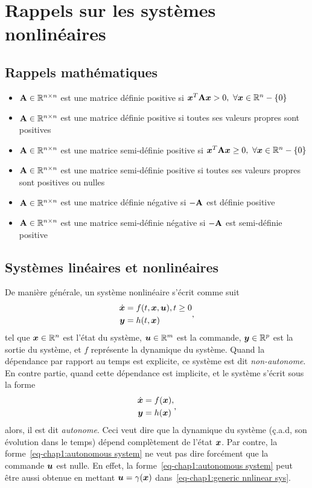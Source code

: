 \graphicspath{{Figures/}}
\chapter{Rappels sur les systèmes nonlinéaires} \label{chap:introduction_Gen}
\section{Rappels mathématiques}\label{sec-chap1:Rappel Math}
\begin{itemize}
	\item $\mathbf{A}\in \mathbb{R}^{n\times n}$ est une matrice définie positive si $\bm{x}^T\mathbf{A}\bm{x}>0, \ \forall \bm{x}\in \mathbb{R}^n-\{0\}$
	\item $\mathbf{A}\in \mathbb{R}^{n\times n}$ est une matrice définie positive si toutes ses valeurs propres sont positives
	\item $\mathbf{A}\in \mathbb{R}^{n\times n}$ est une matrice semi-définie positive si $\bm{x}^T\mathbf{A}\bm{x}\geq0, \ \forall \bm{x}\in \mathbb{R}^n-\{0\}$	
	\item $\mathbf{A}\in \mathbb{R}^{n\times n}$ est une matrice semi-définie positive si toutes ses valeurs propres sont positives ou nulles
	\item $\mathbf{A}\in \mathbb{R}^{n\times n}$ est une matrice définie négative si $-\mathbf{A}$ est définie positive
	\item $\mathbf{A}\in \mathbb{R}^{n\times n}$ est une matrice semi-définie négative si $-\mathbf{A}$ est semi-définie positive
\end{itemize}
\section{Systèmes linéaires et nonlinéaires}
De manière générale, un système nonlinéaire s'écrit comme suit 
\begin{align}\label{eq-chap1:generic nnlinear sys}
	\begin{split}
		\dot{\bm{x}} &= f(t,\bm{x},\bm{u}), t\geq0\\
		\bm{y} &= h(t,\bm{x})
	\end{split},
\end{align}
tel que $\bm{x}\in \mathbb{R}^{n}$ est l'état du système, $\bm{u}\in \mathbb{R}^m$ est la commande, $\bm{y}\in \mathbb{R}^p$ est la sortie du système, et $f$ représente la dynamique du système. Quand la dépendance par rapport au temps est explicite, ce système est dit \emph{non-autonome}. En contre partie, quand cette dépendance est implicite, et le système s'écrit sous la forme
\begin{align}\label{eq-chap1:autonomous system}
	\begin{split}
		\dot{\bm{x}} &= f(\bm{x}),\\
		\bm{y} &= h(\bm{x})
	\end{split},
\end{align}
alors, il est dit \emph{autonome}. Ceci veut dire que la dynamique du système (ç.a.d, son évolution dans le temps) dépend complètement de l'état $\bm{x}$. Par contre, la forme~\eqref{eq-chap1:autonomous system} ne veut pas dire forcément que la commande $\bm{u}$ est nulle. En effet,  la forme~\eqref{eq-chap1:autonomous system} peut être aussi obtenue en mettant $\bm{u} = \gamma(\bm{x})$ dans~\eqref{eq-chap1:generic nnlinear sys}.

